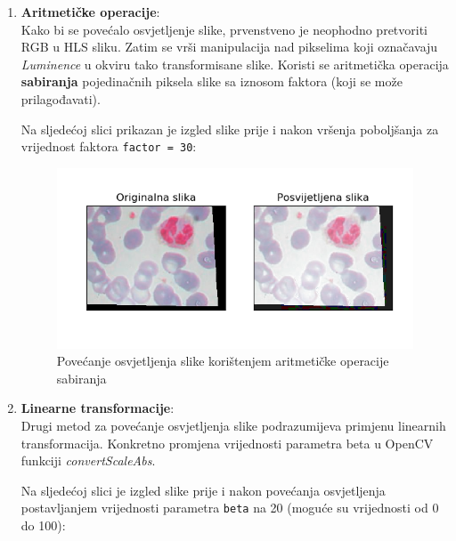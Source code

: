 \documentclass[12pt,a4paper]{article}
\begin{document}
\begin{enumerate}

\item \textbf{Aritmetičke operacije}: \\

Kako bi se povećalo osvjetljenje slike, prvenstveno je neophodno pretvoriti RGB u HLS sliku. Zatim se vrši manipulacija nad pikselima koji označavaju \textit{Luminence} u okviru tako transformisane slike. Koristi se aritmetička operacija \textbf{sabiranja} pojedinačnih piksela slike sa iznosom faktora (koji se može prilagođavati).


Na sljedećoj slici prikazan je izgled slike prije i nakon vršenja poboljšanja za vrijednost faktora \texttt{factor = 30}:

\begin{figure}[H]

\center
\includegraphics[scale=0.9]{s6Osvjetljenje1.png}
\caption{Povećanje osvjetljenja slike korištenjem aritmetičke operacije sabiranja}

\end{figure}

\newpage

\item \textbf{Linearne transformacije}: \\

Drugi metod za povećanje osvjetljenja slike podrazumijeva primjenu linearnih transformacija. Konkretno promjena vrijednosti parametra beta u OpenCV funkciji \textit{convertScaleAbs}.

Na sljedećoj slici je izgled slike prije i nakon povećanja osvjetljenja postavljanjem vrijednosti parametra \texttt{beta} na 20 (moguće su vrijednosti od 0 do 100):

\begin{figure}[H]


\end{figure}
\end{enumerate}
\end{document}
